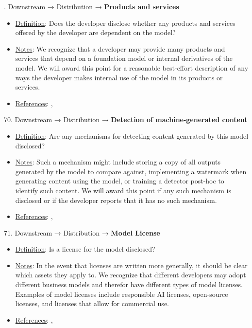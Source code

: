 . Downstream → Distribution → \textbf{Products and services}
\vspace{-\parskip}
\begin{itemize}
\item
\underline{Definition}: Does the developer disclose whether any products and services offered by the developer are dependent on the model?
\item
\underline{Notes}: We recognize that a developer may provide many products and services that depend on a foundation model or internal derivatives of the model. We will award this point for a reasonable best-effort description of any ways the developer makes internal use of the model in its products or services.
\item
\underline{References}: \citet{cobbe2023supply}, \citet{cen2023supplychain}
\end{itemize}


70. Downstream → Distribution → \textbf{Detection of machine-generated content}
\vspace{-\parskip}
\begin{itemize}
\item
\underline{Definition}: Are any mechanisms for detecting content generated by this model disclosed?
\item
\underline{Notes}: Such a mechanism might include storing a copy of all outputs generated by the model to compare against, implementing a watermark when generating content using the model, or training a detector post-hoc to identify such content. We will award this point if any such mechanism is disclosed or if the developer reports that it has no such mechanism.
\item
\underline{References}: \citet{kirchenbauer2023watermark}, \citet{Kuditipudi2023RobustDW}
\end{itemize}


71. Downstream → Distribution → \textbf{Model License}
\vspace{-\parskip}
\begin{itemize}
\item
\underline{Definition}: Is a license for the model disclosed?
\item
\underline{Notes}: In the event that licenses are written more generally, it should be clear which assets they apply to. We recognize that different developers may adopt different business models and therefor have different types of model licenses. Examples of model licenses include responsible AI licenses, open-source licenses, and licenses that allow for commercial use.
\item
\underline{References}: \citet{Pistilli2023}, \citet{chen2023investigation}
\end{itemize}


